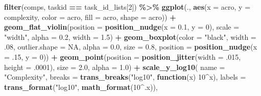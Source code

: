 \documentclass[
]{book}
\newenvironment{Shaded}{\begin{snugshade}}{\end{snugshade}}
\newcommand{\AttributeTok}[1]{\textcolor[rgb]{0.13,0.29,0.53}{#1}}
\newcommand{\ConstantTok}[1]{\textcolor[rgb]{0.56,0.35,0.01}{#1}}
\newcommand{\ControlFlowTok}[1]{\textcolor[rgb]{0.13,0.29,0.53}{\textbf{#1}}}
\newcommand{\DecValTok}[1]{\textcolor[rgb]{0.00,0.00,0.81}{#1}}
\newcommand{\FloatTok}[1]{\textcolor[rgb]{0.00,0.00,0.81}{#1}}
\newcommand{\FunctionTok}[1]{\textcolor[rgb]{0.13,0.29,0.53}{\textbf{#1}}}
\newcommand{\NormalTok}[1]{#1}
\newcommand{\SpecialCharTok}[1]{\textcolor[rgb]{0.81,0.36,0.00}{\textbf{#1}}}
\newcommand{\StringTok}[1]{\textcolor[rgb]{0.31,0.60,0.02}{#1}}
\begin{document}
\begin{Shaded}
\begin{Highlighting}[]
\FunctionTok{filter}\NormalTok{(comps, taskid }\SpecialCharTok{==}\NormalTok{ task\_id\_lists[}\DecValTok{2}\NormalTok{]) }\SpecialCharTok{\%\textgreater{}\%}
  \FunctionTok{ggplot}\NormalTok{(., }\FunctionTok{aes}\NormalTok{(}\AttributeTok{x =}\NormalTok{ acro, }\AttributeTok{y =}\NormalTok{ complexity, }\AttributeTok{color =}\NormalTok{ acro,}
                \AttributeTok{fill =}\NormalTok{ acro, }\AttributeTok{shape =}\NormalTok{ acro)) }\SpecialCharTok{+}
  \FunctionTok{geom\_flat\_violin}\NormalTok{(}\AttributeTok{position =} \FunctionTok{position\_nudge}\NormalTok{(}\AttributeTok{x =} \FloatTok{0.1}\NormalTok{, }\AttributeTok{y =} \DecValTok{0}\NormalTok{),}
                   \AttributeTok{scale =} \StringTok{"width"}\NormalTok{, }\AttributeTok{alpha =} \FloatTok{0.2}\NormalTok{, }\AttributeTok{width =} \FloatTok{1.5}\NormalTok{) }\SpecialCharTok{+}
  \FunctionTok{geom\_boxplot}\NormalTok{(}\AttributeTok{color =} \StringTok{"black"}\NormalTok{, }\AttributeTok{width =}\NormalTok{ .}\DecValTok{08}\NormalTok{, }\AttributeTok{outlier.shape =} \ConstantTok{NA}\NormalTok{, }\AttributeTok{alpha =} \FloatTok{0.0}\NormalTok{,}
               \AttributeTok{size =} \FloatTok{0.8}\NormalTok{, }\AttributeTok{position =} \FunctionTok{position\_nudge}\NormalTok{(}\AttributeTok{x =}\NormalTok{ .}\DecValTok{15}\NormalTok{, }\AttributeTok{y =} \DecValTok{0}\NormalTok{)) }\SpecialCharTok{+}
  \FunctionTok{geom\_point}\NormalTok{(}\AttributeTok{position =} \FunctionTok{position\_jitter}\NormalTok{(}\AttributeTok{width =}\NormalTok{ .}\DecValTok{015}\NormalTok{, }\AttributeTok{height =}\NormalTok{ .}\DecValTok{0001}\NormalTok{),}
             \AttributeTok{size =} \FloatTok{2.0}\NormalTok{, }\AttributeTok{alpha =} \FloatTok{1.0}\NormalTok{) }\SpecialCharTok{+}
  \FunctionTok{scale\_y\_log10}\NormalTok{(}
    \AttributeTok{name =} \StringTok{"Complexity"}\NormalTok{,}
    \AttributeTok{breaks =} \FunctionTok{trans\_breaks}\NormalTok{(}\StringTok{"log10"}\NormalTok{, }\ControlFlowTok{function}\NormalTok{(x) }\DecValTok{10}\SpecialCharTok{\^{}}\NormalTok{x),}
    \AttributeTok{labels =} \FunctionTok{trans\_format}\NormalTok{(}\StringTok{"log10"}\NormalTok{, }\FunctionTok{math\_format}\NormalTok{(}\DecValTok{10}\SpecialCharTok{\^{}}\NormalTok{.x)),}


\end{Highlighting}
\end{Shaded}
\end{document}
